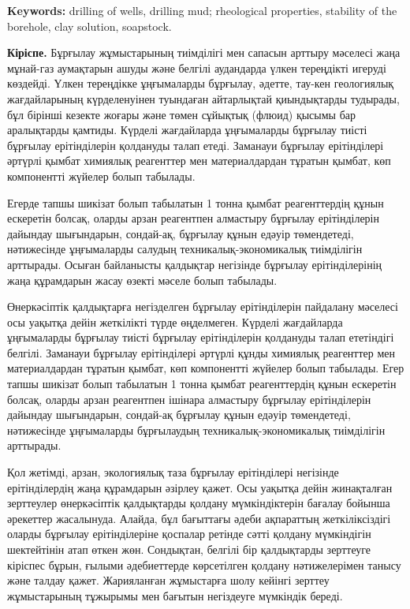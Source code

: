{\bfseries Keywords:} drilling of wells, drilling mud; rheological
properties, stability of the borehole, clay solution, soapstock.
\begin{multicols}{2}

{\bfseries Кіріспе.} Бұрғылау жұмыстарының тиімділігі мен сапасын арттыру
мәселесі жаңа мұнай-газ аумақтарын ашуды және белгілі аудандарда үлкен
тереңдікті игеруді көздейді. Үлкен тереңдікке ұңғымаларды бұрғылау,
әдетте, тау-кен геологиялық жағдайларының күрделенуінен туындаған
айтарлықтай қиындықтарды тудырады, бұл бірінші кезекте жоғары және төмен
сұйықтық (флюид) қысымы бар аралықтарды қамтиды. Күрделі жағдайларда
ұңғымаларды бұрғылау тиісті бұрғылау ерітінділерін қолдануды талап
етеді. Заманауи бұрғылау ерітінділері әртүрлі қымбат химиялық реагенттер
мен материалдардан тұратын қымбат, көп компонентті жүйелер болып
табылады.

Егерде тапшы шикізат болып табылатын 1 тонна қымбат реагенттердің құнын
ескеретін болсақ, оларды арзан реагентпен алмастыру бұрғылау
ерітінділерін дайындау шығындарын, сондай-ақ, бұрғылау құнын едәуір
төмендетеді, нәтижесінде ұңғымаларды салудың техникалық-экономикалық
тиімділігін арттырады. Осыған байланысты қалдықтар негізінде бұрғылау
ерітінділерінің жаңа құрамдарын жасау өзекті мәселе болып табылады.

Өнеркәсіптік қалдықтарға негізделген бұрғылау ерітінділерін пайдалану
мәселесі осы уақытқа дейін жеткілікті түрде өңделмеген. Күрделі
жағдайларда ұңғымаларды бұрғылау тиісті бұрғылау ерітінділерін қолдануды
талап ететіндігі белгілі. Заманауи бұрғылау ерітінділері әртүрлі құнды
химиялық реагенттер мен материалдардан тұратын қымбат, көп компонентті
жүйелер болып табылады. Егер тапшы шикізат болып табылатын 1 тонна
қымбат реагенттердің құнын ескеретін болсақ, оларды арзан реагентпен
ішінара алмастыру бұрғылау ерітінділерін дайындау шығындарын, сондай-ақ
бұрғылау құнын едәуір төмендетеді, нәтижесінде ұңғымаларды бұрғылаудың
техникалық-экономикалық тиімділігін арттырады.

Қол жетімді, арзан, экологиялық таза бұрғылау ерітінділері негізінде
ерітінділердің жаңа құрамдарын әзірлеу қажет. Осы уақытқа дейін
жинақталған зерттеулер өнеркәсіптік қалдықтарды қолдану мүмкіндіктерін
бағалау бойынша әрекеттер жасалынуда. Алайда, бұл бағыттағы әдеби
ақпараттың жеткіліксіздігі оларды бұрғылау ерітінділеріне қоспалар
ретінде сәтті қолдану мүмкіндігін шектейтінін атап өткен жөн. Сондықтан,
белгілі бір қалдықтарды зерттеуге кіріспес бұрын, ғылыми әдебиеттерде
көрсетілген қолдану нәтижелерімен танысу және талдау қажет. Жарияланған
жұмыстарға шолу кейінгі зерттеу жұмыстарының тұжырымы мен бағытын
негіздеуге мүмкіндік береді.


\end{multicols}
